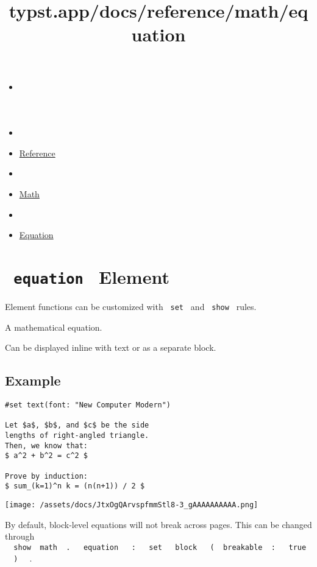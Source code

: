 \title{typst.app/docs/reference/math/equation}

\begin{itemize}
\tightlist
\item
  \href{/docs}{}
\item
  
\item
  \href{/docs/reference/}{Reference}
\item
  
\item
  \href{/docs/reference/math/}{Math}
\item
  
\item
  \href{/docs/reference/math/equation/}{Equation}
\end{itemize}

\section{\texorpdfstring{\texttt{\ equation\ } {{ Element
}}}{ equation   Element }}\label{summary}

\label{element-tooltip}
Element functions can be customized with \texttt{\ set\ } and
\texttt{\ show\ } rules.

A mathematical equation.

Can be displayed inline with text or as a separate block.

\subsection{Example}\label{example}

\begin{verbatim}
#set text(font: "New Computer Modern")

Let $a$, $b$, and $c$ be the side
lengths of right-angled triangle.
Then, we know that:
$ a^2 + b^2 = c^2 $

Prove by induction:
$ sum_(k=1)^n k = (n(n+1)) / 2 $
\end{verbatim}

\texttt{[image: /assets/docs/JtxOgQArvspfmmStl8-3\_gAAAAAAAAAA.png]}

By default, block-level equations will not break across pages. This can
be changed through
\texttt{\ }{\texttt{\ show\ }}\texttt{\ math\ }{\texttt{\ .\ }}\texttt{\ }{\texttt{\ equation\ }}\texttt{\ }{\texttt{\ :\ }}\texttt{\ }{\texttt{\ set\ }}\texttt{\ }{\texttt{\ block\ }}\texttt{\ }{\texttt{\ (\ }}\texttt{\ breakable\ }{\texttt{\ :\ }}\texttt{\ }{\texttt{\ true\ }}\texttt{\ }{\texttt{\ )\ }}\texttt{\ }
.


